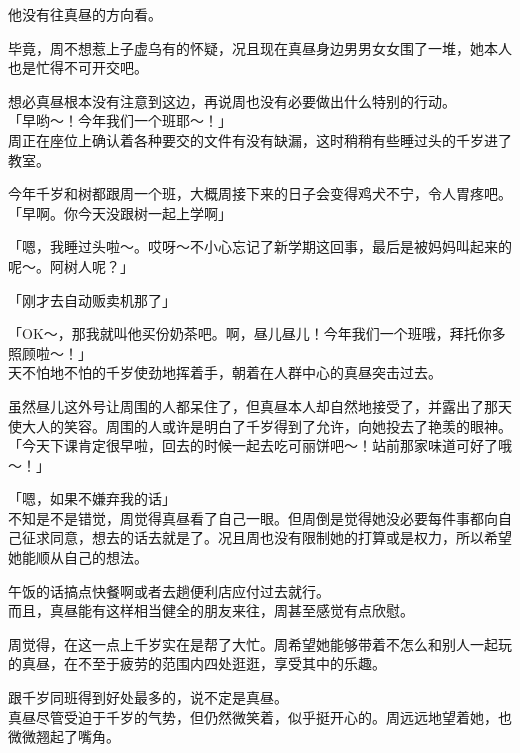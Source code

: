 他没有往真昼的方向看。

毕竟，周不想惹上子虚乌有的怀疑，况且现在真昼身边男男女女围了一堆，她本人也是忙得不可开交吧。

想必真昼根本没有注意到这边，再说周也没有必要做出什么特别的行动。\\

「早哟～！今年我们一个班耶～！」\\

周正在座位上确认着各种要交的文件有没有缺漏，这时稍稍有些睡过头的千岁进了教室。

今年千岁和树都跟周一个班，大概周接下来的日子会变得鸡犬不宁，令人胃疼吧。\\

「早啊。你今天没跟树一起上学啊」

「嗯，我睡过头啦～。哎呀～不小心忘记了新学期这回事，最后是被妈妈叫起来的呢～。阿树人呢？」

「刚才去自动贩卖机那了」

「OK～，那我就叫他买份奶茶吧。啊，昼儿昼儿！今年我们一个班哦，拜托你多照顾啦～！」\\

天不怕地不怕的千岁使劲地挥着手，朝着在人群中心的真昼突击过去。

虽然昼儿这外号让周围的人都呆住了，但真昼本人却自然地接受了，并露出了那天使大人的笑容。周围的人或许是明白了千岁得到了允许，向她投去了艳羡的眼神。\\

「今天下课肯定很早啦，回去的时候一起去吃可丽饼吧～！站前那家味道可好了哦～！」

「嗯，如果不嫌弃我的话」\\

不知是不是错觉，周觉得真昼看了自己一眼。但周倒是觉得她没必要每件事都向自己征求同意，想去的话去就是了。况且周也没有限制她的打算或是权力，所以希望她能顺从自己的想法。

午饭的话搞点快餐啊或者去趟便利店应付过去就行。\\

而且，真昼能有这样相当健全的朋友来往，周甚至感觉有点欣慰。

周觉得，在这一点上千岁实在是帮了大忙。周希望她能够带着不怎么和别人一起玩的真昼，在不至于疲劳的范围内四处逛逛，享受其中的乐趣。

跟千岁同班得到好处最多的，说不定是真昼。\\

真昼尽管受迫于千岁的气势，但仍然微笑着，似乎挺开心的。周远远地望着她，也微微翘起了嘴角。

